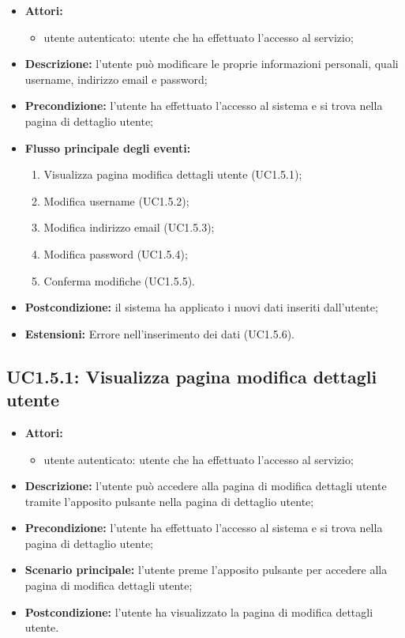 \begin{itemize}
	\item \textbf{Attori:}
	\begin{itemize}
		\item utente autenticato: utente che ha effettuato l'accesso al servizio;
	\end{itemize}
	\item \textbf{Descrizione:} l'utente può modificare le proprie informazioni personali, quali username, indirizzo email e password;
	\item \textbf{Precondizione:} l'utente ha effettuato l'accesso al sistema e si trova nella pagina di dettaglio utente;
	\item \textbf{Flusso principale degli eventi:}
	\begin{enumerate}
		\item Visualizza pagina modifica dettagli utente (UC1.5.1);
		\item Modifica username (UC1.5.2);
		\item Modifica indirizzo email (UC1.5.3);
		\item Modifica password (UC1.5.4);
		\item Conferma modifiche (UC1.5.5).
	\end{enumerate}
	\item \textbf{Postcondizione:} il sistema ha applicato i nuovi dati inseriti dall'utente;
	\item \textbf{Estensioni:} Errore nell'inserimento dei dati (UC1.5.6).
\end{itemize}

\subsection{UC1.5.1: Visualizza pagina modifica dettagli utente}
\begin{itemize}
	\item \textbf{Attori:}
	\begin{itemize}
		\item utente autenticato: utente che ha effettuato l'accesso al servizio;
	\end{itemize}
	\item \textbf{Descrizione:} l'utente può accedere alla pagina di modifica dettagli utente tramite l'apposito pulsante nella pagina di dettaglio utente;
	\item \textbf{Precondizione:} l'utente ha effettuato l'accesso al sistema e si trova nella pagina di dettaglio utente;
	\item \textbf{Scenario principale:} l'utente preme l'apposito pulsante per accedere alla pagina di modifica dettagli utente;
	\item \textbf{Postcondizione:} l'utente ha visualizzato la pagina di modifica dettagli utente.
\end{itemize}

